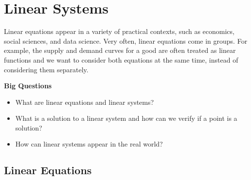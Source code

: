 \section{Linear Systems}

Linear equations appear in a variety of practical contexts, such as economics, social sciences, and data science. Very often, linear equations come in groups. For example, the supply and demand curves for a good are often treated as linear functions and we want to consider both equations at the same time, instead of considering them separately.

\begin{colourframe}[tolGrey]{\bf Big Questions}
	
	\begin{itemize}
		\item What are linear equations and linear systems?
		\item What is a solution to a linear system and how can we verify if a point is a solution?
		\item How can linear systems appear in the real world?
	\end{itemize}
\end{colourframe}


\subsection*{Linear Equations}


